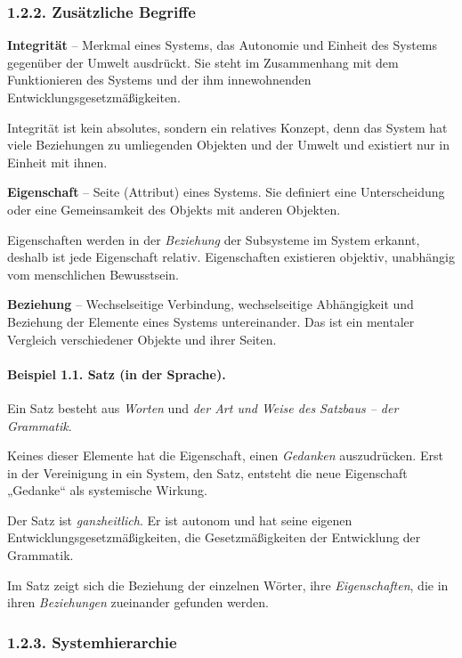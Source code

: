 \documentclass[11pt,a4paper]{article}
\begin{document}
\subsubsection*{1.2.2. Zusätzliche Begriffe}

\textbf{Integrität} -- Merkmal eines Systems, das Autonomie und Einheit des
Systems gegenüber der Umwelt ausdrückt. Sie steht im Zusammenhang mit dem
Funktionieren des Systems und der ihm innewohnenden
Entwicklungsgesetzmäßigkeiten.

Integrität ist kein absolutes, sondern ein relatives Konzept, denn das System
hat viele Beziehungen zu umliegenden Objekten und der Umwelt und existiert nur
in Einheit mit ihnen.

\textbf{Eigenschaft} -- Seite (Attribut) eines Systems. Sie definiert 
eine Unterscheidung oder eine Gemeinsamkeit des Objekts mit anderen Objekten.

Eigenschaften werden in der \emph{Beziehung} der Subsysteme im System erkannt,
deshalb ist jede Eigenschaft relativ. Eigenschaften existieren objektiv,
unabhängig vom menschlichen Bewusstsein.

\textbf{Beziehung} -- Wechselseitige Verbindung, wechselseitige Abhängigkeit
und Beziehung der Elemente eines Systems untereinander. Das ist ein mentaler
Vergleich verschiedener Objekte und ihrer Seiten.

\paragraph{Beispiel 1.1. Satz (in der Sprache).}
Ein Satz besteht aus \emph{Worten} und \emph{der Art und Weise des Satzbaus --
  der Grammatik}.

Keines dieser Elemente hat die Eigenschaft, einen \emph{Gedanken}
auszudrücken.  Erst in der Vereinigung in ein System, den Satz, entsteht die
neue Eigenschaft „Gedanke“ als systemische Wirkung.

Der Satz ist \emph{ganzheitlich}. Er ist autonom und hat seine eigenen
Entwicklungsgesetzmäßig\-keiten, die Gesetzmäßigkeiten der Entwicklung der
Grammatik.

Im Satz zeigt sich die Beziehung der einzelnen Wörter, ihre
\emph{Eigenschaften}, die in ihren \emph{Beziehungen} zueinander gefunden
werden.

\subsubsection*{1.2.3. Systemhierarchie}
\end{document}
